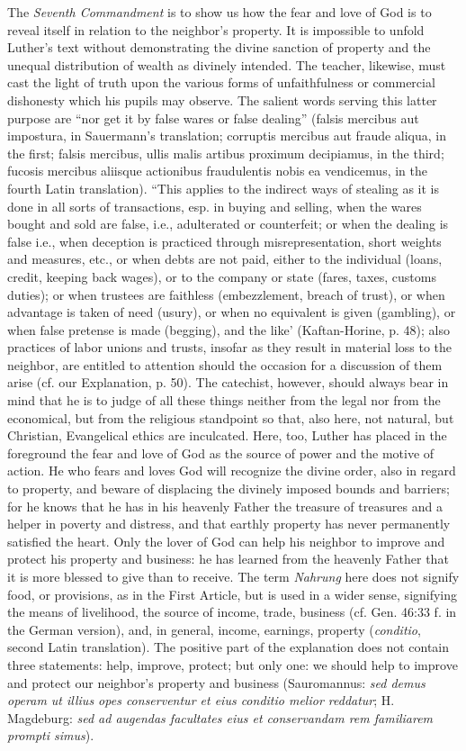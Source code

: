 The \emph{Seventh Commandment} is to show us how the fear and love of God is to reveal itself in relation to the neighbor’s property. It is impossible to unfold Luther’s text without demonstrating the divine sanction of property and the unequal distribution of wealth as divinely intended. The teacher, likewise, must cast the light of truth upon the various forms of unfaithfulness or commercial dishonesty which his pupils may observe. The salient words serving this latter purpose are “nor get it by false wares or false dealing” (falsis mercibus aut impostura, in Sauermann’s translation; corruptis mercibus aut fraude aliqua, in the first; falsis mercibus, ullis malis artibus proximum decipiamus, in the third; fucosis mercibus aliisque actionibus fraudulentis nobis ea vendicemus, in the fourth Latin translation). “This applies to the indirect ways of stealing as it is done in all sorts of transactions, esp. in buying and selling, when the wares bought and sold are false, i.e., adulterated or counterfeit; or when the dealing is false i.e., when deception is practiced through misrepresentation, short weights and measures, etc., or when debts are not paid, either to the individual (loans, credit, keeping back wages), or to the company or state (fares, taxes, customs duties); or when trustees are faithless (embezzlement, breach of trust), or when advantage is taken of need (usury), or when
no equivalent is given (gambling), or when false pretense is made (begging), and the like’ (Kaftan-Horine, p. 48); also practices of labor unions and trusts, insofar as they result in material loss to the neighbor, are entitled to attention should the occasion for a discussion of them arise (cf. our Explanation, p. 50). The catechist, however, should always bear in mind that he is to judge of all these things neither from the legal nor from the economical, but from the religious standpoint so that, also here, not natural, but Christian, Evangelical ethics are inculcated. Here, too, Luther has placed in the foreground the fear and love of God as the source of power and the motive of action. He who fears and loves God will recognize the divine order, also in regard to property, and beware of displacing the divinely imposed bounds and barriers; for he knows that he has in his heavenly Father the treasure of treasures and a helper in poverty and distress, and that earthly property has never permanently satisfied the heart. Only the lover of God can help his neighbor to improve and protect his property and business: he has learned from the heavenly Father that it is more blessed to give than to receive. The term \emph{Nahrung} here does not signify food, or provisions, as in the First Article, but is used in a wider sense, signifying the means of livelihood, the source of income, trade, business (cf. Gen. 46:33 f. in the German version), and, in general, income, earnings, property (\emph{conditio}, second Latin translation). The positive part of the explanation does not contain three statements: help, improve, protect; but only one: we should help to improve and protect our neighbor’s property and business (Sauromannus: \emph{sed demus operam ut illius opes conserventur et eius conditio melior reddatur}; H. Magdeburg: \emph{sed ad augendas facultates eius et conservandam rem familiarem prompti simus}).

